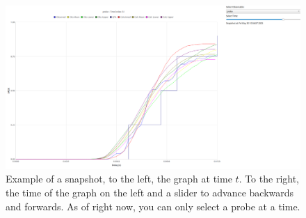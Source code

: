     \begin{figure}[H]
        \begin{center}
        \includegraphics[width = \textwidth]{img/manual/snapshot.png}
        \end{center}
        \caption{Example of a snapshot, to the left, the graph at time $t$. To the right, the time of the graph on the left and a slider to advance backwards and forwards. As of right now, you can only select a probe at a time.}
    \end{figure}
